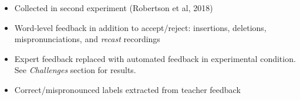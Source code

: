 \documentclass[
  gradient, landscape,
  style=bow,
  logo=figs/05_Uniligual_FullColour_Horizontal.eps,
]{utposter}
\begin{document}
\begin{columns}
{  \begin{itemize}
    \item Collected in second experiment (Robertson et al, 2018)
    \item Word-level feedback in addition to accept/reject: insertions,
          deletions, mispronunciations, and \textit{recast} recordings
    \item Expert feedback replaced with automated feedback in experimental
          condition. See \textit{Challenges} section for results.
    \item Correct/mispronounced labels extracted from teacher feedback
  \end{itemize}
}



\end{columns}
\end{document}
